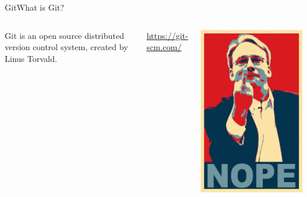 \documentclass[10pt,compress]{beamer} %
\begin{document}
\begin{frame}{Git}{What is Git?}

\begin{columns}
Git is an open source distributed version control system, created by Linus Torvald.

\url{https://git-scm.com/}

\begin{center}
 \includegraphics[width=.8\textwidth]{figs/torvalds-to-nvidia}
\end{center}
\end{columns}

\end{frame}
\end{document}
